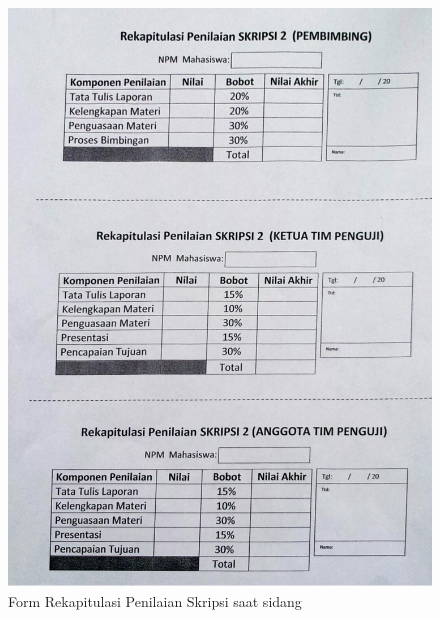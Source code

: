 \begin{figure}[H]
	\centering
	\includegraphics[scale=0.50]{Gambar/dokumen_rekap}
	\caption[Form Rekapitulasi Penilaian Skripsi saat sidang]{Form Rekapitulasi Penilaian Skripsi saat sidang} 
	\label{fig: rekapAsli}
\end{figure}